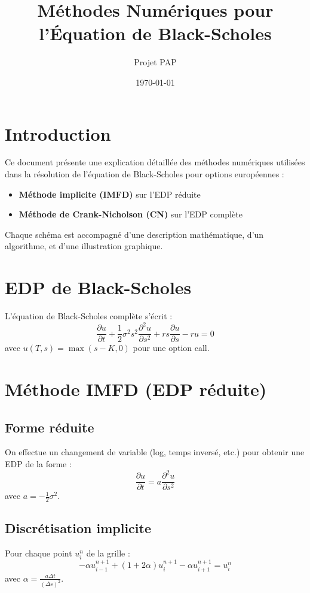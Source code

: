 \documentclass[11pt]{article}
\title{Méthodes Numériques pour l'Équation de Black-Scholes}
\author{Projet PAP}
\date{\today}
\begin{document}
\maketitle

\section*{Introduction}
Ce document présente une explication détaillée des méthodes numériques utilisées dans la résolution de l'équation de Black-Scholes pour options européennes :

\begin{itemize}
    \item \textbf{Méthode implicite (IMFD)} sur l'EDP réduite
    \item \textbf{Méthode de Crank-Nicholson (CN)} sur l'EDP complète
\end{itemize}

Chaque schéma est accompagné d'une description mathématique, d'un algorithme, et d'une illustration graphique.

\section{EDP de Black-Scholes}
L'équation de Black-Scholes complète s'écrit :
\begin{equation}
    \frac{\partial u}{\partial t} + \frac{1}{2}\sigma^2 s^2 \frac{\partial^2 u}{\partial s^2} + rs \frac{\partial u}{\partial s} - ru = 0
\end{equation}
avec $u(T, s) = \max(s-K, 0)$ pour une option call.

\section{Méthode IMFD (EDP réduite)}
\subsection*{Forme réduite}
On effectue un changement de variable (log, temps inversé, etc.) pour obtenir une EDP de la forme :
\begin{equation}
    \frac{\partial u}{\partial t} = a \frac{\partial^2 u}{\partial s^2}
\end{equation}
avec $a = -\frac{1}{2}\sigma^2$.

\subsection*{Discrétisation implicite}
Pour chaque point $u_i^n$ de la grille :
\begin{equation}
    -\alpha u_{i-1}^{n+1} + (1 + 2\alpha) u_i^{n+1} - \alpha u_{i+1}^{n+1} = u_i^n
\end{equation}
avec $\alpha = \frac{a \Delta t}{(\Delta s)^2}$.
\end{document}
